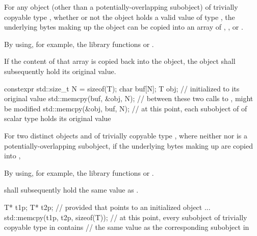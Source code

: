 \pnum
{}%
%
For any object (other than a potentially-overlapping subobject) of trivially copyable type
, whether or not the object holds a valid value of type
, the underlying bytes making up the
object can be copied into an array of
,
, or
.
\begin{footnote}
By using, for example, the library
functions  or .
\end{footnote}
If the content of that array
is copied back into the object, the object shall
subsequently hold its original value.
\begin{example}
\begin{codeblock}
constexpr std::size_t N = sizeof(T);
char buf[N];
T obj;                          //  initialized to its original value
std::memcpy(buf, &obj, N);      // between these two calls to ,  might be modified
std::memcpy(&obj, buf, N);      // at this point, each subobject of  of scalar type holds its original value
\end{codeblock}
\end{example}

\pnum
For two distinct objects  and 
of trivially copyable type ,
where neither  nor  is a potentially-overlapping subobject,
if the underlying bytes making up
 are copied into ,
\begin{footnote}
By using, for example,
the library functions  or .
\end{footnote}
  shall subsequently hold the same value as
.
\begin{example}
\begin{codeblock}
T* t1p;
T* t2p;
    // provided that  points to an initialized object ...
std::memcpy(t1p, t2p, sizeof(T));
    // at this point, every subobject of trivially copyable type in  contains
    // the same value as the corresponding subobject in 
\end{codeblock}
\end{example}


